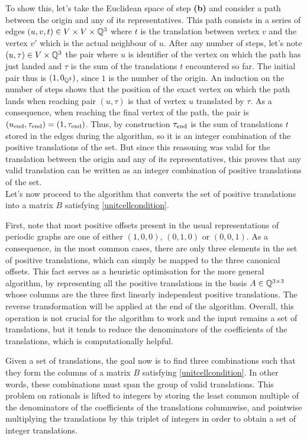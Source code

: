 \documentclass[main.tex]{subfiles}
\begin{document}
To show this, let's take the Euclidean space of step {\sffamily\small\bfseries(b)} and consider a path between the origin and any of its representatives. This path consists in a series of edges $(u,v,t)\in V\times V\times\mathbb{Q}^3$ where $t$ is the translation between vertex $v$ and the vertex $v'$ which is the actual neighbour of $u$. After any number of steps, let's note $(u,\tau)\in V\times\mathbb{Q}^3$ the pair where $u$ is identifier of the vertex on which the path has just landed and $\tau$ is the sum of the translations $t$ encountered so far. The initial pair thus is $(1,0_{\mathbb{Q}^3})$, since $1$ is the number of the origin. An induction on the number of steps shows that the position of the exact vertex on which the path lands when reaching pair $(u,\tau)$ is that of vertex $u$ translated by $\tau$. As a consequence, when reaching the final vertex of the path, the pair is $(u_\text{end},\tau_\text{end}) = (1,\tau_\text{end})$. Thus, by construction $\tau_\text{end}$ is the sum of translations $t$ stored in the edges during the algorithm, so it is an integer combination of the positive translations of the set. But since this reasoning was valid for the translation between the origin and any of its representatives, this proves that any valid translation can be written as an integer combination of positive translations of the set.\\

Let's now proceed to the algorithm that converts the set of positive translations into a matrix $B$ satisfying \autoref{unitcellcondition}.

First, note that most positive offsets present in the usual representations of periodic graphs are one of either $(1,0,0)$, $(0,1,0)$ or $(0,0,1)$. As a consequence, in the most common cases, there are only three elements in the set of positive translations, which can simply be mapped to the three canonical offsets. This fact serves as a heuristic optimisation for the more general algorithm, by representing all the positive translations in the basis $A\in\mathbb{Q}^{3\times3}$ whose columns are the three first linearly independent positive translations. The reverse transformation will be applied at the end of the algorithm. Overall, this operation is not crucial for the algorithm to work and the input remains a set of translations, but it tends to reduce the denominators of the coefficients of the translations, which is computationally helpful.

Given a set of translations, the goal now is to find three combinations such that they form the columns of a matrix $B$ satisfying \autoref{unitcellcondition}. In other words, these combinations must span the group of valid translations. This problem on rationals is lifted to integers by storing the least common multiple of the denominators of the coefficients of the translations columnwise, and pointwise multiplying the translations by this triplet of integers in order to obtain a set of integer translations.
\end{document}
